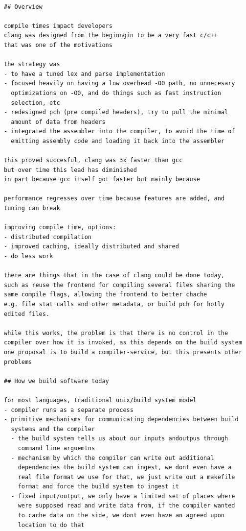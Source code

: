 \documentclass[12pt, a4paper]{report}
\begin{document}
\begin{Verbatim}[fontsize=\small]

## Overview

compile times impact developers
clang was designed from the beginngin to be a very fast c/c++
that was one of the motivations

the strategy was
- to have a tuned lex and parse implementation
- focused heavily on having a low overhead -O0 path, no unnecesary
  optimizations on -O0, and do things such as fast instruction
  selection, etc
- redesigned pch (pre compiled headers), try to pull the minimal
  amount of data from headers
- integrated the assembler into the compiler, to avoid the time of
  emitting assembly code and loading it back into the assembler

this proved succesful, clang was 3x faster than gcc
but over time this lead has diminished
in part because gcc itself got faster but mainly because

performance regresses over time because features are added, and
tuning can break

improving compile time, options:
- distributed compilation
- improved caching, ideally distributed and shared
- do less work

there are things that in the case of clang could be done today,
such as reuse the frontend for compiling several files sharing the
same compile flags, allowing the frontend to better chache
e.g. file stat calls and other metadata, or build pch for hotly
edited files.

while this works, the problem is that there is no control in the
compiler over how it is invoked, as this depends on the build system
one proposal is to build a compiler-service, but this presents other
problems

## How we build software today

for most languages, traditional unix/build system model
- compiler runs as a separate process
- primitive mechanisms for communicating dependencies between build
  systems and the compiler
  - the build system tells us about our inputs andoutpus through
    command line arguemtns
  - mechanism by which the compiler can write out additional
    dependencies the build system can ingest, we dont even have a
    real file format we use for that, we just write out a makefile
    format and force the build system to ingest it
  - fixed input/output, we only have a limited set of places where
    were supposed read and write data from, if the compiler wanted
    to cache data on the side, we dont even have an agreed upon
    location to do that


\end{Verbatim}
\end{document}
